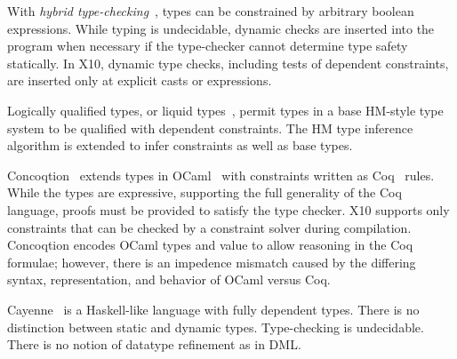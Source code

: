 

With {\em hybrid type-checking}~\cite{flanagan-popl06,flanagan-fool06},
types can be constrained by arbitrary boolean expressions.
While typing is undecidable, dynamic checks are inserted into
the program when necessary if the type-checker cannot determine
type safety statically.
In X10, dynamic type checks, including tests of dependent
constraints, are inserted only at explicit casts or
 expressions.




Logically qualified types, or liquid types~\cite{liquid-types},
permit types in a base HM-style type system to be
qualified with dependent constraints.  The HM type inference
algorithm is extended to infer constraints as well as base
types.  

Concoqtion~\cite{concoqtion} extends types in OCaml~\cite{ocaml}
with constraints written as Coq~\cite{coq} rules.
While the types are expressive, supporting the full generality
of the Coq language, proofs must be
provided to satisfy the type checker.
X10 supports only constraints that can be checked by a
constraint solver during compilation.
Concoqtion encodes OCaml types and value to allow reasoning in
the Coq formulae; however, there is an impedence mismatch
caused by the differing syntax, representation, and behavior
of OCaml versus Coq.




Cayenne~\cite{cayenne} is a Haskell-like language with fully dependent types.
There is no distinction between static and dynamic types.
Type-checking is undecidable.
There is no notion of datatype refinement as in DML.

